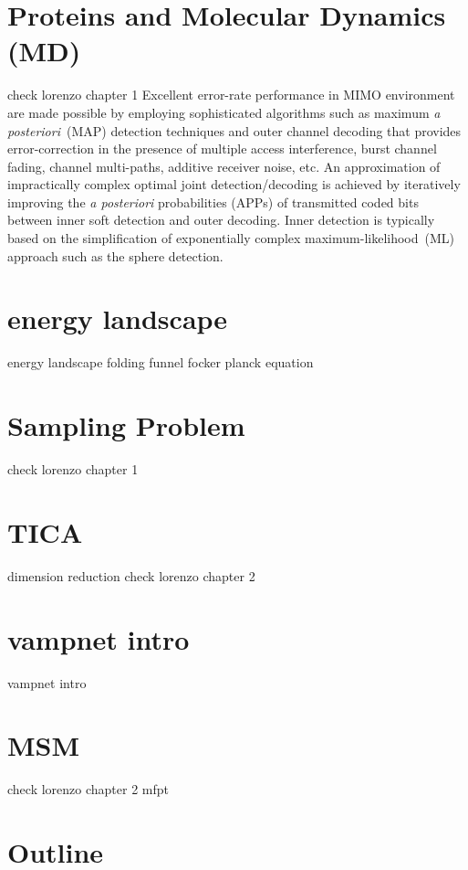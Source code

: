 \section{Proteins and Molecular Dynamics (MD)}
\label{sec:MD}
check lorenzo chapter 1
Excellent error-rate performance in MIMO environment are made possible by employing sophisticated algorithms such as maximum \emph{a posteriori}~(MAP) detection techniques and outer channel decoding that provides error-correction in the presence of multiple access interference, burst channel fading, channel multi-paths, additive receiver noise, etc. An approximation of impractically complex optimal joint detection/decoding is achieved by iteratively improving the \emph{a posteriori} probabilities (APPs) of transmitted coded bits between inner soft detection and outer decoding. Inner detection is typically based on the simplification of exponentially complex maximum-likelihood~(ML) approach such as the sphere detection. 

\section{energy landscape }
energy landscape 
folding funnel
focker planck equation
\section{Sampling Problem}
check  lorenzo chapter 1

\section{TICA}
dimension reduction
check  lorenzo chapter 2

\section{vampnet intro}
vampnet intro

\section{MSM}
check  lorenzo chapter 2
mfpt

\section{Outline}